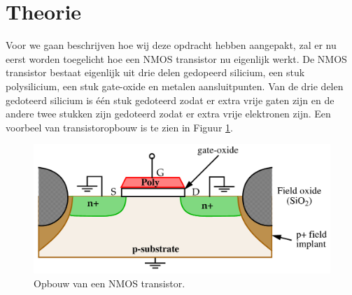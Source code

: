 \documentclass{scrartcl}  %
\begin{document}
\section{Theorie}
Voor we gaan beschrijven hoe wij deze opdracht hebben aangepakt, zal er nu eerst worden toegelicht hoe een NMOS transistor nu eigenlijk werkt. 
De NMOS transistor bestaat eigenlijk uit drie delen gedopeerd silicium, een stuk polysilicium, een stuk gate-oxide en metalen aansluitpunten. 
Van de drie delen gedoteerd silicium is één stuk gedoteerd zodat er extra vrije gaten zijn en de andere twee stukken zijn gedoteerd zodat er extra vrije elektronen zijn. 
Een voorbeel van transistoropbouw is te zien in Figuur \ref{fig:NMOS-transistor}.
\begin{figure}[H]
\centering
	\includegraphics[width=\textwidth]{resources/MOS-opbouw}
	\caption{Opbouw van een NMOS transistor.\cite{patel-slides}}
	\label{fig:NMOS-transistor}
\end{figure}
\end{document}
